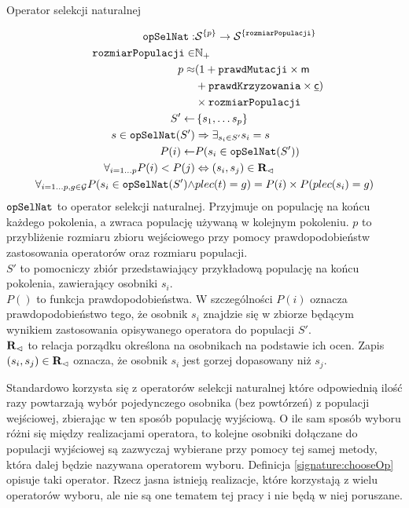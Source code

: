 \documentclass[./FM_mgr.tex]{subfiles}
\begin{document}
\begin{signature}
	\caption{Operator selekcji naturalnej \label{signature:natSel}}
	\begin{align}
	\mathtt{opSelNat}: &{\mathcal{S}}^{ \{ p \}} \rightarrow {\mathcal{S}}^{ \{ \mathtt{rozmiarPopulacji} \}} \\
	\mathtt{rozmiarPopulacji} \in &\mathbb{N}_{+} \\
	p \approx &(1 + \mathtt{prawdMutacji} \times \mathsf{m} \\
	&+ \mathtt{prawdKrzyzowania} \times \mathsf{\underline{c}}) \\
	&\times \mathtt{rozmiarPopulacji} \\
	S' \gets &\left\{ s_1, \ldots s_p \right\} \\
	s \in \mathtt{opSelNat}(S') &\Rightarrow \exists_{s_i \in S'}  s_i = s \\
	P(i) \gets &P(s_i \in \mathtt{opSelNat}(S')) \\
	\forall_{i = 1 \ldots p}P(i) < P(j) &\Leftrightarrow (s_i, s_j) \in {\mathbf{R}}_{\lhd} \\
	\label{line:gender_resistant}
	\forall_{i = 1 \ldots p, g \in \mathcal{G}} P(s_i \in \mathtt{opSelNat}(S') \wedge & plec(t) = g) = P(i) \times P(plec(s_i) = g)
	\end{align}
	$\mathtt{opSelNat}$ to operator selekcji naturalnej.
	Przyjmuje on populację na końcu każdego pokolenia, a zwraca populację używaną w kolejnym pokoleniu.
	$p$ to przybliżenie rozmiaru zbioru wejściowego przy pomocy prawdopodobieństw zastosowania operatorów oraz rozmiaru populacji.\\
	$S'$ to pomocniczy zbiór przedstawiający przykładową populację na końcu pokolenia, zawierający osobniki $s_i$. \\
	$P()$ to funkcja prawdopodobieństwa. 
	W szczególności $P(i)$ oznacza prawdopodobieństwo tego, że osobnik $s_i$ znajdzie się w zbiorze będącym wynikiem zastosowania opisywanego operatora do populacji $S'$.\\
	${\mathbf{R}}_{\lhd}$ to relacja porządku określona na osobnikach na podstawie ich ocen. Zapis $(s_i, s_j) \in {\mathbf{R}}_{\lhd}$ oznacza, że osobnik $s_i$ jest gorzej dopasowany niż $s_j$.
\end{signature}

Standardowo korzysta się z operatorów selekcji naturalnej które odpowiednią ilość razy powtarzają wybór pojedynczego osobnika (bez powtórzeń) z populacji wejściowej, zbierając w ten sposób populację wyjściową. 
O ile sam sposób wyboru różni się między realizacjami operatora, to kolejne osobniki dołączane do populacji wyjściowej są zazwyczaj wybierane przy pomocy tej samej metody, która dalej będzie nazywana operatorem wyboru.
Definicja \ref{signature:chooseOp} opisuje taki operator.
Rzecz jasna istnieją realizacje, które korzystają z wielu operatorów wyboru, ale nie są one tematem tej pracy i nie będą w niej poruszane.
\end{document}
